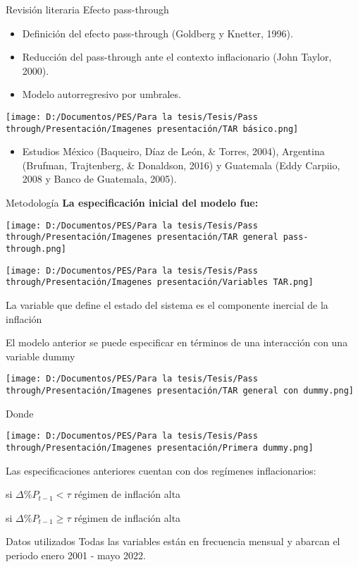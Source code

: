 \documentclass[
  ignorenonframetext,
]{beamer}
\providecommand{\tightlist}{%
  \setlength{\itemsep}{0pt}\setlength{\parskip}{0pt}}
\begin{document}
\begin{frame}{Revisión literaria}
\protect\hypertarget{revisiuxf3n-literaria}{}
Efecto pass-through

\begin{itemize}
\tightlist
\item
  Definición del efecto pass-through (Goldberg y Knetter, 1996).
\item
  Reducción del pass-through ante el contexto inflacionario (John
  Taylor, 2000).
\item
  Modelo autorregresivo por umbrales.
\end{itemize}

\texttt{[image: D:/Documentos/PES/Para la tesis/Tesis/Pass through/Presentación/Imagenes presentación/TAR básico.png]}

\begin{itemize}
\tightlist
\item
  Estudios México (Baqueiro, Díaz de León, \& Torres, 2004), Argentina
  (Brufman, Trajtenberg, \& Donaldson, 2016) y Guatemala (Eddy Carpiio,
  2008 y Banco de Guatemala, 2005).
\end{itemize}
\end{frame}

\begin{frame}{Metodología}
\protect\hypertarget{metodologuxeda}{}
\textbf{La especificación inicial del modelo fue:}

\texttt{[image: D:/Documentos/PES/Para la tesis/Tesis/Pass through/Presentación/Imagenes presentación/TAR general pass-through.png]}

\texttt{[image: D:/Documentos/PES/Para la tesis/Tesis/Pass through/Presentación/Imagenes presentación/Variables TAR.png]}

La variable que define el estado del sistema es el componente inercial
de la inflación
\end{frame}

\begin{frame}{}
\protect\hypertarget{section-1}{}
El modelo anterior se puede especificar en términos de una interacción
con una variable dummy

\texttt{[image: D:/Documentos/PES/Para la tesis/Tesis/Pass through/Presentación/Imagenes presentación/TAR general con dummy.png]}

Donde

\texttt{[image: D:/Documentos/PES/Para la tesis/Tesis/Pass through/Presentación/Imagenes presentación/Primera dummy.png]}

Las especificaciones anteriores cuentan con dos regímenes
inflacionarios:

si \(\Delta\%P_{t-1}<\tau\) régimen de inflación alta

si \(\Delta\%P_{t-1}\geq\tau\) régimen de inflación alta
\end{frame}

\begin{frame}{Datos utilizados}
\protect\hypertarget{datos-utilizados}{}
Todas las variables están en frecuencia mensual y abarcan el periodo
enero 2001 - mayo 2022.
\end{frame}
\end{document}
